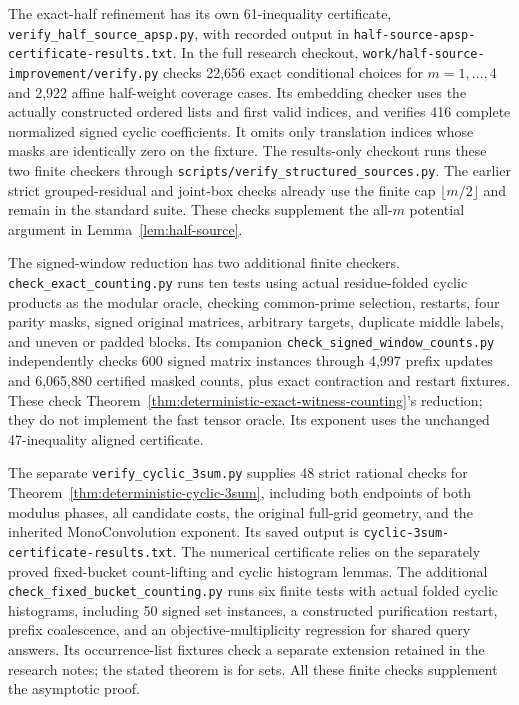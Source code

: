 \documentclass[11pt]{article}
\begin{document}
The exact-half refinement has its own 61-inequality certificate,
\texttt{verify\_half\_source\_apsp.py}, with recorded output in
\texttt{half-source-\allowbreak apsp-\allowbreak certificate-\allowbreak results.txt}.
In the full research checkout,
\texttt{work/\allowbreak half-\allowbreak source-\allowbreak improvement/\allowbreak verify.py} checks
22,656 exact conditional choices for $m=1,\ldots,4$ and 2,922
affine half-weight coverage cases. Its embedding checker uses the
actually constructed ordered lists and first valid indices, and
verifies 416 complete normalized signed cyclic coefficients.
It omits only translation indices whose masks are identically
zero on the fixture. The results-only checkout runs these two finite
checkers through \texttt{scripts/verify\_structured\_sources.py}.
The earlier strict grouped-residual and joint-box
checks already use the finite cap $\lfloor m/2\rfloor$ and remain
in the standard suite. These checks supplement the all-$m$ potential
argument in Lemma~\ref{lem:half-source}.

The signed-window reduction has two additional finite checkers.
\texttt{check\_exact\_counting.py} runs ten tests using actual residue-folded
cyclic products as the modular oracle, checking common-prime selection,
restarts, four parity masks, signed original matrices, arbitrary targets,
duplicate middle labels, and uneven or padded blocks. Its companion
\texttt{check\_signed\_window\_counts.py} independently checks 600 signed
matrix instances through 4,997 prefix updates and 6,065,880 certified
masked counts, plus exact contraction and restart fixtures. These check
Theorem~\ref{thm:deterministic-exact-witness-counting}'s reduction; they do
not implement the fast tensor oracle. Its exponent uses the unchanged
47-inequality aligned certificate.

The separate \texttt{verify\_cyclic\_3sum.py} supplies 48 strict rational
checks for Theorem~\ref{thm:deterministic-cyclic-3sum}, including both
endpoints of both modulus phases, all candidate costs, the original
full-grid geometry, and the inherited MonoConvolution exponent. Its
saved output is \texttt{cyclic-3sum-certificate-results.txt}. The numerical
certificate relies on the separately proved fixed-bucket count-lifting
and cyclic histogram lemmas. The additional
\texttt{check\_fixed\_bucket\_counting.py} runs six finite tests with actual
folded cyclic histograms, including 50 signed set instances, a constructed
purification restart, prefix coalescence, and an objective-multiplicity
regression for shared query answers. Its occurrence-list fixtures check a
separate extension retained in the research notes; the stated theorem is
for sets. All these finite checks supplement the asymptotic proof.
\end{document}
